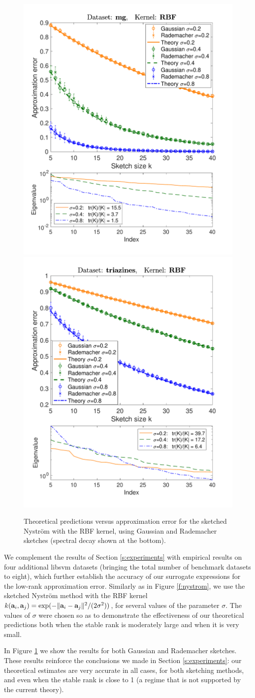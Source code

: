 \documentclass[../../thesis.tex]{subfiles}
\begin{document}
\begin{figure}[htbp]
  \includegraphics[width=.47\textwidth]{mg-supp}\nobreak\includegraphics[width=.47\textwidth]{triazines-supp}
  \caption{Theoretical predictions versus approximation error for the
    sketched Nystr\"om with the RBF kernel, using Gaussian and
    Rademacher sketches (spectral decay shown at the bottom).}\label{f:nystrom2}
\end{figure}


We complement the results of Section \ref{s:experiments} with
empirical results on four additional libsvm datasets \citep{libsvm} (bringing
the total number of benchmark datasets to eight), which further
establish the accuracy of our surrogate expressions for the low-rank approximation
error. Similarly as in Figure \ref{f:nystrom}, we use the sketched
Nystr\"om method \citep{revisiting-nystrom} with the RBF kernel
$k(\mathbf a_i,\mathbf a_j)=\exp(-\|\mathbf a_i-\mathbf a_j\|^2/(2\sigma^2))$, for several values
of the parameter $\sigma$. The values of $\sigma$ were chosen so as to
demonstrate the effectiveness of our theoretical predictions both when the
stable rank is moderately large and when it is very small.

In Figure \ref{f:nystrom2} we show the results for both Gaussian and
Rademacher sketches. These results reinforce the conclusions we made in
Section \ref{s:experiments}: our theoretical estimates are very
accurate in all cases, for both sketching methods, and even when the
stable rank is close to 1 (a regime that is not supported by the
current theory).
\end{document}
